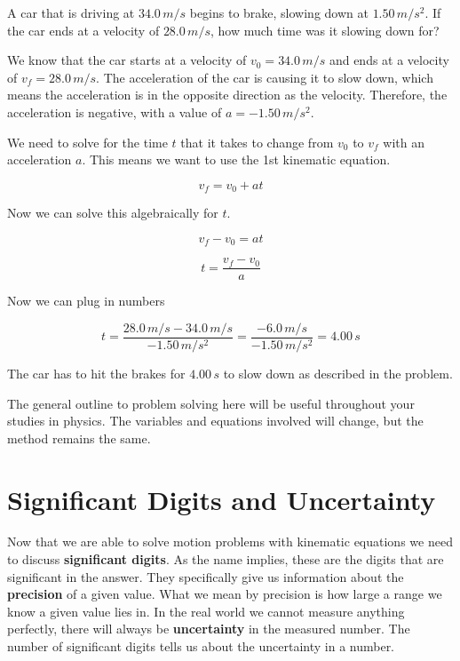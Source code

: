 \documentclass[12pt]{book}
\begin{document}
\begin{exampleblock}

A car that is driving at $34.0 \, m/s$ begins to brake, slowing down at $1.50 \, m/s^2$. If the car ends at a velocity of $28.0 \, m/s$, how much time was it slowing down for?

\hspace{10pt}

We know that the car starts at a velocity of $v_0 = 34.0 \, m/s$ and ends at a velocity of $v_f = 28.0 \, m/s$. The acceleration of the car is causing it to slow down, which means the acceleration is in the opposite direction as the velocity. Therefore, the acceleration is negative, with a value of $a = -1.50 \, m/s^2$.

We need to solve for the time $t$ that it takes to change from $v_0$ to $v_f$ with an acceleration $a$. This means we want to use the 1st kinematic equation.

\begin{equation}
v_f = v_0 + at
\end{equation}

Now we can solve this algebraically for $t$.

\begin{equation}
v_f - v_0 = at
\end{equation}

\begin{equation}
t = \frac{v_f - v_0}{a}
\end{equation}

Now we can plug in numbers

\begin{equation}
t = \frac{28.0 \, m/s - 34.0 \, m/s}{-1.50 \, m/s^2} = \frac{-6.0 \, m/s}{-1.50 \, m/s^2} = 4.00 \, s
\end{equation}

The car has to hit the brakes for $4.00 \, s$ to slow down as described in the problem. 

\end{exampleblock}

The general outline to problem solving here will be useful throughout your studies in physics. The variables and equations involved will change, but the method remains the same.

\section{Significant Digits and Uncertainty}
Now that we are able to solve motion problems with kinematic equations we need to discuss \textbf{significant digits}. As the name implies, these are the digits that are significant in the answer. They specifically give us information about the \textbf{precision} of a given value. What we mean by precision is how large a range we know a given value lies in. In the real world we cannot measure anything perfectly, there will always be \textbf{uncertainty} in the measured number. The number of significant digits tells us about the uncertainty in a number.
\end{document}
